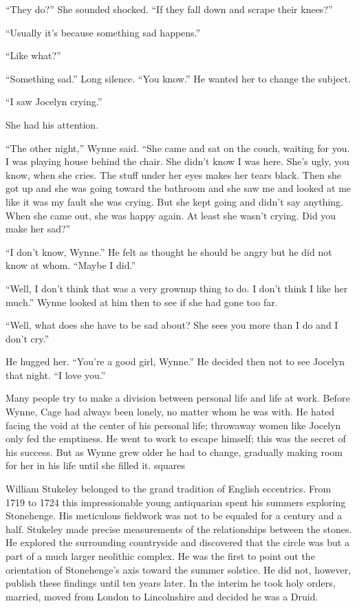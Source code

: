 “They do?” She sounded shocked. “If they fall down and scrape their knees?”

“Usually it’s because something sad happens.”

“Like what?”

“Something sad.” Long silence. “You know.” He wanted her to change the subject.

“I saw Jocelyn crying.”

She had his attention.

“The other night,” Wynne said. “She came and sat on the couch, waiting for you. I was playing house behind the chair. She didn’t know I was here. She’s ugly, you know, when she cries. The stuff under her eyes makes her tears black. Then she got up and she was going toward the bathroom and she saw me and looked at me like it was my fault she was crying. But she kept going and didn’t say anything. When she came out, she was happy again. At least she wasn’t crying. Did you make her sad?”

“I don’t know, Wynne.” He felt as thought he should be angry but he did not know at whom. “Maybe I did.”

“Well, I don’t think that was a very grownup thing to do. I don’t think I like her much.” Wynne looked at him then to see if she had gone too far.

“Well, what does she have to be sad about? She sees you more than I do and I don’t cry.”

He hugged her. “You’re a good girl, Wynne.” He decided then not to see Jocelyn that night. “I love you.”

Many people try to make a division between personal life and life at work. Before Wynne, Cage had always been lonely, no matter whom he was with. He hated facing the void at the center of his personal life; throwaway women like Jocelyn only fed the emptiness. He went to work to escape himself; this was the secret of his success. But as Wynne grew older he had to change, gradually making room for her in his life until she filled it.
squares

William Stukeley belonged to the grand tradition of English eccentrics. From 1719 to 1724 this impressionable young antiquarian spent his summers exploring Stonehenge. His meticulous fieldwork was not to be equaled for a century and a half. Stukeley made precise measurements of the relationships between the stones. He explored the surrounding countryside and discovered that the circle was but a part of a much larger neolithic complex. He was the first to point out the orientation of Stonehenge’s axis toward the summer solstice. He did not, however, publish these findings until ten years later. In the interim he took holy orders, married, moved from London to Lincolnshire and decided he was a Druid.

